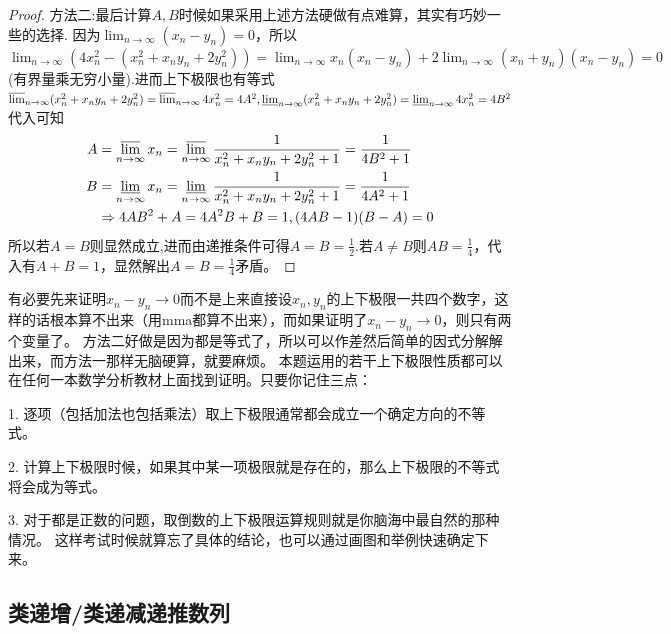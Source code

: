 \documentclass[../../main.tex]{subfiles}%
\begin{document}
\begin{proof}
{\color{blue}方法二:}最后计算\(A,B\)时候如果采用上述方法硬做有点难算，其实有巧妙一些的选择.
因为\(\lim_{n\rightarrow\infty}(x_n - y_n)=0\)，所以\(\lim_{n\rightarrow \infty} (4x_{n}^{2}-(x_{n}^{2}+x_ny_n+2y_{n}^{2}))=\lim_{n\rightarrow \infty} x_n\left( x_n-y_n \right) +2\lim_{n\rightarrow \infty} \left( x_n+y_n \right) \left( x_n-y_n \right) =0\)(有界量乘无穷小量).进而上下极限也有等式
\(\varlimsup_{n\rightarrow\infty}(x_n^2 + x_ny_n + 2y_n^2)=\varlimsup_{n\rightarrow\infty}4x_n^2 = 4A^2,\varliminf_{n\rightarrow\infty}(x_n^2 + x_ny_n + 2y_n^2)=\varliminf_{n\rightarrow\infty}4x_n^2 = 4B^2\)
代入可知
\begin{align*}
A&=\varlimsup_{n\rightarrow\infty}x_n=\varlimsup_{n\rightarrow\infty}\frac{1}{x_n^2 + x_ny_n + 2y_n^2 + 1}=\frac{1}{4B^2 + 1}\\
B&=\varliminf_{n\rightarrow\infty}x_n=\varliminf_{n\rightarrow\infty}\frac{1}{x_n^2 + x_ny_n + 2y_n^2 + 1}=\frac{1}{4A^2 + 1}\\
&\Rightarrow 4AB^2+A = 4A^2B + B = 1,(4AB - 1)(B - A)=0
\end{align*}
所以若\(A = B\)则显然成立,进而由递推条件可得$A=B=\frac{1}{2}$.若\(A\neq B\)则\(AB=\frac{1}{4}\)，代入有\(A + B = 1\)，显然解出\(A = B=\frac{1}{4}\)矛盾。

\end{proof}
\begin{remark}
有必要先来证明\(x_n - y_n\rightarrow0\)而不是上来直接设\(x_n,y_n\)的上下极限一共四个数字，这样的话根本算不出来（用mma都算不出来），而如果证明了\(x_n - y_n\rightarrow0\)，则只有两个变量了。
方法二好做是因为都是等式了，所以可以作差然后简单的因式分解解出来，而方法一那样无脑硬算，就要麻烦。
本题运用的若干上下极限性质都可以在任何一本数学分析教材上面找到证明。只要你记住三点：

1. 逐项（包括加法也包括乘法）取上下极限通常都会成立一个确定方向的不等式。

2. 计算上下极限时候，如果其中某一项极限就是存在的，那么上下极限的不等式将会成为等式。

3. 对于都是正数的问题，取倒数的上下极限运算规则就是你脑海中最自然的那种情况。
这样考试时候就算忘了具体的结论，也可以通过画图和举例快速确定下来。
\end{remark}




\subsection{类递增/类递减递推数列}
\end{document}
